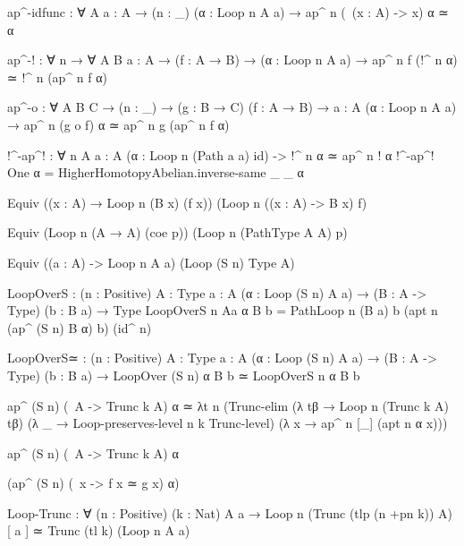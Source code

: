 {  ap^-idfunc : ∀ {A} {a : A} → (n : _) (α : Loop n A a) → ap^ n (\ (x : A) -> x) α ≃ α

  ap^-! : ∀ n → ∀ {A B} {a : A} → (f : A → B) → (α : Loop n A a)
          → ap^ n f (!^ n α) ≃ !^ n (ap^ n f α)

  ap^-o : ∀ {A B C} → (n : _) → (g : B → C) (f : A → B)
          → {a : A} (α : Loop n A a)
          → ap^ n (g o f) α ≃ ap^ n g (ap^ n f α) 
  
  
  !^-ap^! : ∀ n {A} {a : A} (α : Loop n (Path a a) id) -> !^ n α ≃ ap^ n ! α
  !^-ap^! One α = HigherHomotopyAbelian.inverse-same _ _ α

  
  Equiv ((x : A) → Loop n (B x) (f x)) (Loop n ((x : A) -> B x) f)

  Equiv (Loop n (A → A) (coe p)) (Loop n (Path{Type} A A) p)

  Equiv ((a : A) -> Loop n A a) (Loop (S n) Type A)

  LoopOverS :  (n : Positive) {A : Type} {a : A} (α : Loop (S n) A a) 
             → (B : A -> Type) (b : B a) → Type
  LoopOverS n {A}{a} α B b = 
    Path{Loop n (B a) b} 
        (apt n (ap^ (S n) B α) b)
        (id^ n)

    LoopOverS≃ : (n : Positive) {A : Type} {a : A} (α : Loop (S n) A a) → (B : A -> Type) (b : B a) 
               → LoopOver (S n) α B b ≃ LoopOverS n α B b 

    ap^ (S n) (\ A -> Trunc k A) α ≃ λt n (Trunc-elim (λ tβ → Loop n (Trunc k A) tβ)
                                                      (λ _ → Loop-preserves-level n k Trunc-level) 
                                                      (λ x → ap^ n [_] (apt n α x))) 

    ap^ (S n) (\ A -> Trunc k A) α

    (ap^ (S n) (\ x -> f x ≃ g x) α)

    Loop-Trunc : ∀ (n : Positive) (k : Nat) {A} {a} → Loop n (Trunc (tlp (n +pn k)) A) [ a ] ≃ Trunc (tl k) (Loop n A a)
}
